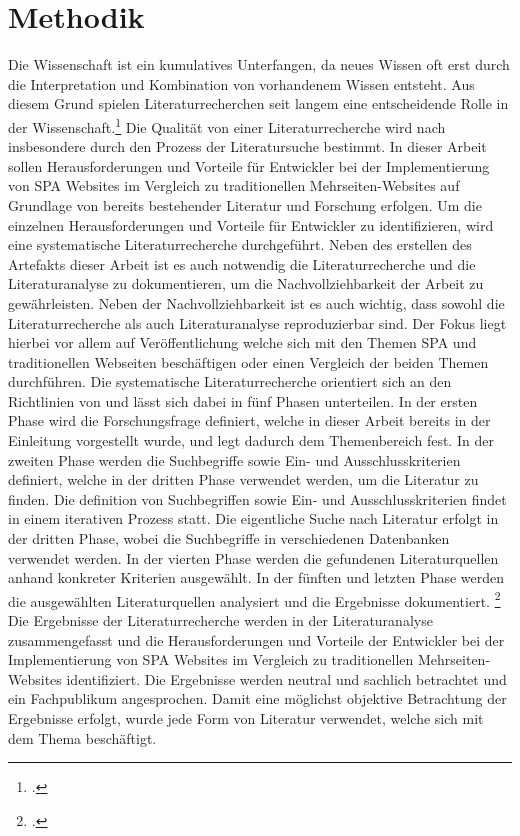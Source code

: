 \section{Methodik}
Die Wissenschaft ist ein kumulatives Unterfangen, da neues Wissen oft erst durch die Interpretation und Kombination von vorhandenem Wissen entsteht.
Aus diesem Grund spielen Literaturrecherchen seit langem eine entscheidende Rolle in der Wissenschaft.\footcite[Vgl.][Seite 1]{conf/ecis/BrockeSNRPC09}
Die Qualität von einer Literaturrecherche wird nach \citeauthor{conf/ecis/BrockeSNRPC09} insbesondere durch den Prozess der Literatursuche bestimmt.
In dieser Arbeit sollen Herausforderungen und Vorteile für Entwickler bei der Implementierung von \ac{SPA} Websites im Vergleich zu traditionellen Mehrseiten-Websites auf Grundlage von bereits bestehender Literatur und Forschung erfolgen.
Um die einzelnen Herausforderungen und Vorteile für Entwickler zu identifizieren, wird eine systematische Literaturrecherche durchgeführt.
Neben des erstellen des Artefakts dieser Arbeit ist es auch notwendig die Literaturrecherche und die Literaturanalyse zu dokumentieren, um die Nachvollziehbarkeit der Arbeit zu gewährleisten.
Neben der Nachvollziehbarkeit ist es auch wichtig, dass sowohl die Literaturrecherche als auch Literaturanalyse reproduzierbar sind.
Der Fokus liegt hierbei vor allem auf Veröffentlichung welche sich mit den Themen \ac{SPA} und traditionellen Webseiten beschäftigen oder einen Vergleich der beiden Themen durchführen.
Die systematische Literaturrecherche orientiert sich an den Richtlinien von \citeauthor{conf/ecis/BrockeSNRPC09} und lässt sich dabei in fünf Phasen unterteilen.
In der ersten Phase wird die Forschungsfrage definiert, welche in dieser Arbeit bereits in der Einleitung vorgestellt wurde, und legt dadurch dem Themenbereich fest.
In der zweiten Phase werden die Suchbegriffe sowie Ein- und Ausschlusskriterien definiert, welche in der dritten Phase verwendet werden, um die Literatur zu finden.
Die definition von Suchbegriffen sowie Ein- und Ausschlusskriterien findet in einem iterativen Prozess statt.
Die eigentliche Suche nach Literatur erfolgt in der dritten Phase, wobei die Suchbegriffe in verschiedenen Datenbanken verwendet werden.
In der vierten Phase werden die gefundenen Literaturquellen anhand konkreter Kriterien ausgewählt.
In der fünften und letzten Phase werden die ausgewählten Literaturquellen analysiert und die Ergebnisse dokumentiert. \footcite[Vgl.][Seite 2]{conf/ecis/BrockeSNRPC09}
Die Ergebnisse der Literaturrecherche werden in der Literaturanalyse zusammengefasst und die Herausforderungen und Vorteile der Entwickler bei der Implementierung von \ac{SPA} Websites im Vergleich zu traditionellen Mehrseiten-Websites identifiziert.
Die Ergebnisse werden neutral und sachlich betrachtet und ein Fachpublikum angesprochen. Damit eine möglichst objektive Betrachtung der Ergebnisse erfolgt, wurde jede Form von Literatur verwendet, welche sich mit dem Thema beschäftigt.

